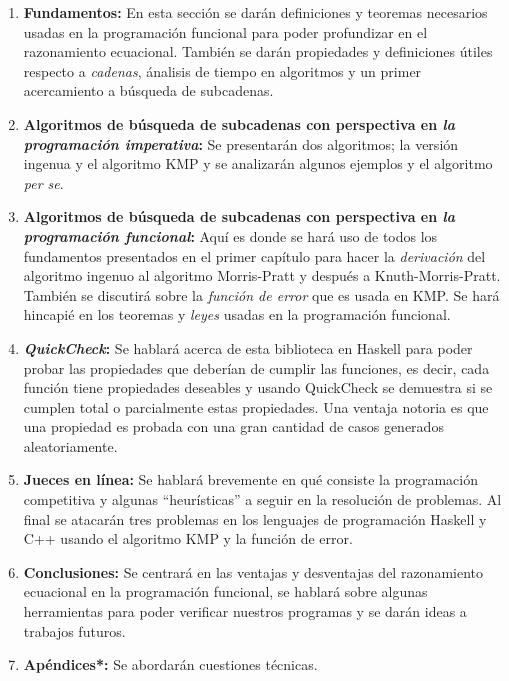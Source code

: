 \documentclass[letterpaper,10pt]{article}
\begin{document}
\begin{enumerate}

\item \textbf{Fundamentos:} En esta sección se darán definiciones y teoremas necesarios usadas en
la programación funcional para poder profundizar en el razonamiento ecuacional. También se darán
propiedades y definiciones útiles respecto a \textit{cadenas}, ánalisis de tiempo en algoritmos y
un primer acercamiento a búsqueda de subcadenas.

\item \textbf{Algoritmos de búsqueda de subcadenas con perspectiva en \textit{la programación
imperativa}:} Se presentarán dos algoritmos; la versión ingenua y el algoritmo KMP y se analizarán
algunos ejemplos y el algoritmo \textit{per se}.

\item \textbf{Algoritmos de búsqueda de subcadenas con perspectiva en \textit{la programación
funcional}:} Aquí es donde se hará uso de todos los fundamentos presentados en el primer capítulo
para hacer la \textit{derivación} del algoritmo ingenuo al algoritmo Morris-Pratt y después a
Knuth-Morris-Pratt. También se discutirá sobre la \textit{función de error} que es usada en KMP.
Se hará hincapié en los teoremas y \textit{leyes} usadas en la programación funcional.

\item \textbf{\textit{QuickCheck}:} Se hablará acerca de esta biblioteca en Haskell para poder
probar las propiedades que deberían de cumplir las funciones, es decir, cada función tiene
propiedades deseables y usando QuickCheck se demuestra si se cumplen total o parcialmente
estas propiedades. Una ventaja notoria es que una propiedad es probada con una gran cantidad de
casos generados aleatoriamente.

\item \textbf{Jueces en línea:} Se hablará brevemente en qué consiste la programación competitiva
y algunas ``heurísticas'' a seguir en la resolución de problemas. Al final se atacarán tres
problemas en los lenguajes de programación Haskell y C++ usando el algoritmo KMP y la función
de error.

\item \textbf{Conclusiones:} Se centrará en las ventajas y desventajas del razonamiento
ecuacional en la programación funcional, se hablará sobre algunas herramientas para poder
verificar nuestros programas y se darán ideas a trabajos futuros.

\item \textbf{Apéndices*:} Se abordarán cuestiones técnicas.

\end{enumerate}
\end{document}
